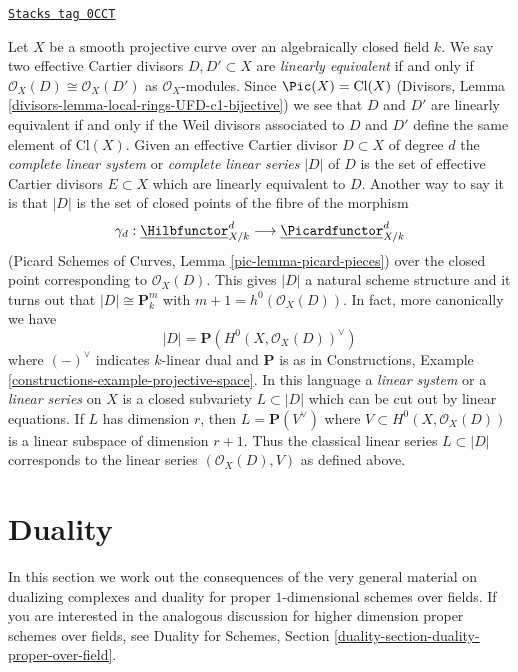 \begin{remark}

\label{curves-remark-classical-linear-series}
\href{https://stacks.math.columbia.edu/tag/0CCT}{\texttt{Stacks tag 0CCT}}

Let $X$ be a smooth projective curve over an algebraically closed field $k$.
We say two effective Cartier divisors $D, D' \subset X$ are
{\it linearly equivalent} if and only if
$\mathcal{O}_X(D) \cong \mathcal{O}_X(D')$ as $\mathcal{O}_X$-modules.
Since $\Pic(X) = \text{Cl}(X)$
(Divisors, Lemma \ref{divisors-lemma-local-rings-UFD-c1-bijective})
we see that $D$ and $D'$ are linearly equivalent
if and only if the Weil divisors associated to
$D$ and $D'$ define the same element of $\text{Cl}(X)$.
Given an effective Cartier divisor $D \subset X$ of degree $d$ the
{\it complete linear system} or {\it complete linear series} $|D|$ of $D$
is the set of effective Cartier divisors $E \subset X$
which are linearly equivalent to $D$.
Another way to say it is that $|D|$ is the set of closed
points of the fibre of the morphism
$$
\gamma_d :
\underline{\Hilbfunctor}^d_{X/k}
\longrightarrow
\underline{\Picardfunctor}^d_{X/k}
$$
(Picard Schemes of Curves, Lemma \ref{pic-lemma-picard-pieces})
over the closed point corresponding to $\mathcal{O}_X(D)$.
This gives $|D|$ a natural scheme structure and it
turns out that $|D| \cong \mathbf{P}^m_k$ with
$m + 1 = h^0(\mathcal{O}_X(D))$. In fact, more canonically we have
$$
|D| = \mathbf{P}(H^0(X, \mathcal{O}_X(D))^\vee)
$$
where $(-)^\vee$ indicates $k$-linear dual and $\mathbf{P}$ is as
in Constructions, Example \ref{constructions-example-projective-space}.
In this language a {\it linear system} or a {\it linear series} on
$X$ is a closed subvariety $L \subset |D|$ which can be cut out by
linear equations. If $L$ has dimension $r$, then $L = \mathbf{P}(V^\vee)$
where $V \subset H^0(X, \mathcal{O}_X(D))$ is a linear subspace
of dimension $r + 1$. Thus the classical linear series
$L \subset |D|$ corresponds to the linear series $(\mathcal{O}_X(D), V)$
as defined above.
\end{remark}

\section{Duality}
\label{curves-section-duality}
In this section we work out the consequences of the very general
material on dualizing complexes and duality for proper $1$-dimensional
schemes over fields. If you are interested in the analogous discussion
for higher dimension proper schemes over fields, see
Duality for Schemes, Section \ref{duality-section-duality-proper-over-field}.

